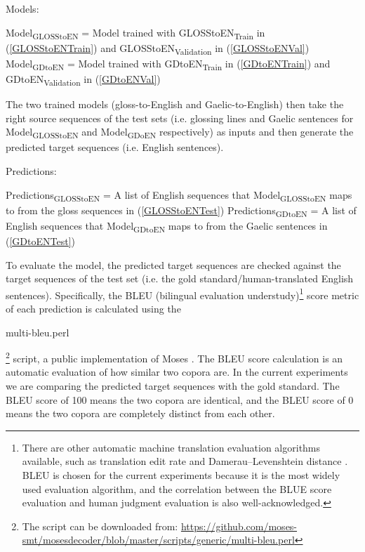 \documentclass[a4paper]{article}
\begin{document}
\begin{exe}
\ex Models: 
	\begin{xlist}
	\ex \label{ModelGlossToEN} Model\textsubscript{GLOSStoEN} = Model trained with GLOSStoEN\textsubscript{Train} in (\ref{GLOSStoENTrain}) and GLOSStoEN\textsubscript{Validation} in (\ref{GLOSStoENVal})
	\ex \label{ModelGDToEN}Model\textsubscript{GDtoEN} = Model trained with GDtoEN\textsubscript{Train} in (\ref{GDtoENTrain}) and GDtoEN\textsubscript{Validation} in (\ref{GDtoENVal}) 
	\end{xlist}	
\end{exe}
The two trained models (gloss-to-English and Gaelic-to-English) then take the right source sequences of the test sets (i.e. glossing lines and Gaelic sentences for Model\textsubscript{GLOSStoEN} and Model\textsubscript{GDoEN} respectively) as inputs and then generate the predicted target sequences (i.e. English sentences). 

\begin{exe}
\ex Predictions: 
	\begin{xlist}
	\ex Predictions\textsubscript{GLOSStoEN} = A list of English sequences that Model\textsubscript{GLOSStoEN} maps to from the gloss sequences in (\ref{GLOSStoENTest}) 
	\ex Predictions\textsubscript{GDtoEN} = A list of English sequences that Model\textsubscript{GDtoEN} maps to from the Gaelic sentences in (\ref{GDtoENTest}) 
	\end{xlist}	
\end{exe}

To evaluate the model, the predicted target sequences are checked against the target sequences of the test set (i.e. the gold standard/human-translated English sentences). Specifically, the BLEU (bilingual evaluation understudy)\footnote{There are other automatic machine translation evaluation algorithms available, such as translation edit rate \citep{Snover06astudy} and Damerau–Levenshtein distance \citep{damerau1964technique, levenshtein1966binary}. BLEU is chosen for the current experiments because it is the most widely used evaluation algorithm, and the correlation between the BLUE score evaluation and human judgment evaluation is also well-acknowledged.} score metric \citep{bleu} of each prediction is calculated using the \begin{myfont} multi-bleu.perl\end{myfont}\footnote{The script can be downloaded from: \url{https://github.com/moses-smt/mosesdecoder/blob/master/scripts/generic/multi-bleu.perl}} 
script, a public implementation of Moses \citep{moses}. The BLEU score calculation is an automatic evaluation of how similar two copora are. In the current experiments we are comparing the predicted target sequences with the gold standard. The BLEU score of 100 means the two copora are identical, and the BLEU score of 0 means the two copora are completely distinct from each other.
\end{document}
